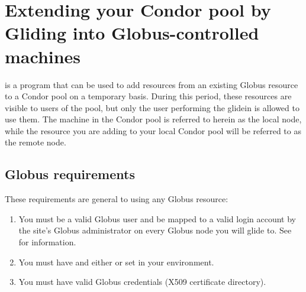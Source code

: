 \section{\label{sec:Glidein}Extending your Condor pool by Gliding into Globus-controlled machines}


 is a program that can be used to add resources from an
existing Globus resource to a Condor 
pool on a temporary basis. During this period, these resources are visible 
to users of the pool, but only the user performing the glidein is allowed 
to use them. The machine in the Condor pool is referred to herein as the
local node, while the resource you are adding to your local Condor pool
will be referred to as the remote node.

\subsection{Globus requirements}
These requirements are general to using any Globus resource:
\begin{enumerate}

\item You must be a valid Globus user and be mapped to a valid login account by
the site's Globus administrator on every Globus node you will glide to.
See  for information.

\item You must have  and either  or 
 set in your environment.

\item You must have valid Globus credentials (X509 certificate directory).


\end{enumerate}

